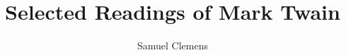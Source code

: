 \documentclass{novelette} %
\title{Selected Readings of Mark Twain}
\author{Samuel Clemens}
\begin{document}
\frontmatter


\mainmatter
\header{\allsmcp{\thetitle}}{\ital{\theauthor}}



\end{document}
